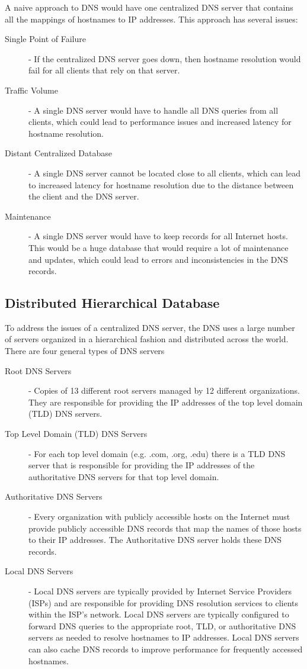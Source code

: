 \documentclass[12pt letter]{report}
\begin{document}
A naive approach to DNS would have one centralized DNS server that
contains all the mappings of hostnames to IP addresses. This approach
has several issues:
\begin{description}
  \item[Single Point of Failure] - If the centralized DNS server goes down, then
    hostname resolution would fail for all clients that rely on that
    server.
  \item[Traffic Volume] - A single DNS server would have to handle
    all DNS queries from all clients, which could lead to performance
    issues and increased latency for hostname resolution.
  \item[Distant Centralized Database] - A single DNS server cannot be
    located close to all clients, which can lead to increased latency
    for hostname resolution due to the distance between the client
    and the DNS server.
  \item[Maintenance] - A single DNS server would have to keep records
    for all Internet hosts. This would be a huge database that would
    require a lot of maintenance and updates, which could lead to
    errors and inconsistencies in the DNS records.
\end{description}

\subsection{Distributed Hierarchical Database}

To address the issues of a centralized DNS server, the DNS uses a
large number of servers organized in a hierarchical fashion and
distributed across the world. There are four general types of DNS servers
\begin{description}
  \item[Root DNS Servers]  - Copies of 13 different root servers
    managed by 12 different organizations. They are responsible for
    providing the IP addresses of the top level domain (TLD) DNS servers.
  \item[Top Level Domain (TLD) DNS Servers] - For each top level
    domain (e.g. .com, .org, .edu) there is a TLD DNS server that is
    responsible for providing the IP addresses of the authoritative
    DNS servers for that top level domain.
  \item[Authoritative DNS Servers] - Every organization with publicly
    accessible hosts on the Internet must provide publicly accessible
    DNS records that map the names of those hosts to their IP
    addresses. The Authoritative DNS server holds these DNS records.
  \item[Local DNS Servers] - Local DNS servers are typically provided
    by Internet Service Providers (ISPs) and are responsible for
    providing DNS resolution services to clients within the ISP's
    network. Local DNS servers are typically configured to forward
    DNS queries to the appropriate root, TLD, or authoritative DNS
    servers as needed to resolve hostnames to IP addresses. Local DNS
    servers can also cache DNS records to improve performance for
    frequently accessed hostnames.
\end{description}
\end{document}
